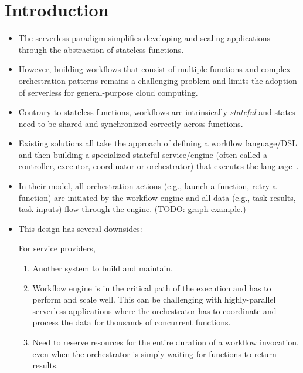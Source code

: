 \section{Introduction}

\begin{itemize}
  \item The serverless paradigm simplifies developing and scaling applications
  through the abstraction of stateless functions.

  \item However, building workflows that consist of multiple functions and
  complex orchestration patterns remains a challenging problem and limits the
  adoption of serverless for general-purpose cloud computing.

  \item Contrary to stateless functions, workflows are intrinsically
  \emph{stateful} and states need to be shared and synchronized correctly
  across functions.

  \item Existing solutions all take the approach of defining a workflow
  language/DSL and then building a specialized stateful service/engine (often
  called a controller, executor, coordinator or orchestrator) that executes
  the language~\cite{gg-atc, excamera, kappa, triggerflow, pywren,
  durable-functions, aws-step-functions, google-cloud-composer,
  google-workflows}.

  \item In their model, all orchestration actions (e.g., launch a function,
  retry a function) are initiated by the workflow engine and all data (e.g.,
  task results, task inputs) flow through the engine. (TODO:
  graph example.)

  \item This design has several downsides:

  For service providers,

  \begin{enumerate}
    \item Another system to build and maintain.

    \item Workflow engine is in the critical path of the execution and has to
    perform and scale well. This can be challenging with highly-parallel
    serverless applications where the orchestrator has to coordinate and
    process the data for thousands of concurrent functions.

    \item Need to reserve resources for the entire duration of a workflow
    invocation, even when the orchestrator is simply waiting for functions to
    return results.


\end{enumerate}
\end{itemize}

